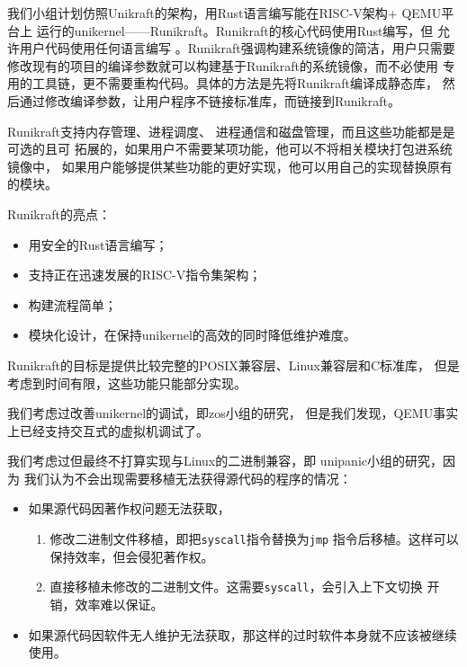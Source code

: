 \documentclass[UTF8,fontset=none,linespread=1.15]{ctexart}
\begin{document}
我们小组计划仿照Unikraft的架构，用Rust语言编写能在RISC-V架构+ QEMU平台上
运行的unikernel——Runikraft。Runikraft的核心代码使用Rust编写，但
允许用户代码使用任何语言编写
。Runikraft强调构建系统镜像的简洁，用户只需要
修改现有的项目的编译参数就可以构建基于Runikraft的系统镜像，而不必使用
专用的工具链，更不需要重构代码。具体的方法是先将Runikraft编译成静态库，
然后通过修改编译参数，让用户程序不链接标准库，而链接到Runikraft。

Runikraft支持内存管理、进程调度、
进程通信和磁盘管理，而且这些功能都是是可选的且可
拓展的，如果用户不需要某项功能，他可以不将相关模块打包进系统镜像中，
如果用户能够提供某些功能的更好实现，他可以用自己的实现替换原有的模块。

Runikraft的亮点：
\begin{itemize}
\item 用安全的Rust语言编写；
\item 支持正在迅速发展的RISC-V指令集架构；
\item 构建流程简单；
\item 模块化设计，在保持unikernel的高效的同时降低维护难度。
\end{itemize}

Runikraft的目标是提供比较完整的POSIX兼容层、Linux兼容层和C标准库，
但是考虑到时间有限，这些功能只能部分实现。


我们考虑过改善unikernel的调试，即zos小组的研究，
但是我们发现，QEMU事实上已经支持交互式的虚拟机调试了。

我们考虑过但最终不打算实现与Linux的二进制兼容，即
unipanic小组的研究，因为
我们认为不会出现需要移植无法获得源代码的程序的情况：
\begin{itemize}
\item 如果源代码因著作权问题无法获取，
    \begin{enumerate}
    \item 修改二进制文件移植，即把\texttt{syscall}指令替换为\texttt{jmp}
    指令后移植。这样可以保持效率，但会侵犯著作权。
    \item 直接移植未修改的二进制文件。这需要\texttt{syscall}，会引入上下文切换
    开销，效率难以保证。
    \end{enumerate}
\item 如果源代码因软件无人维护无法获取，那这样的过时软件本身就不应该被继续使用。
\end{itemize}
\end{document}
